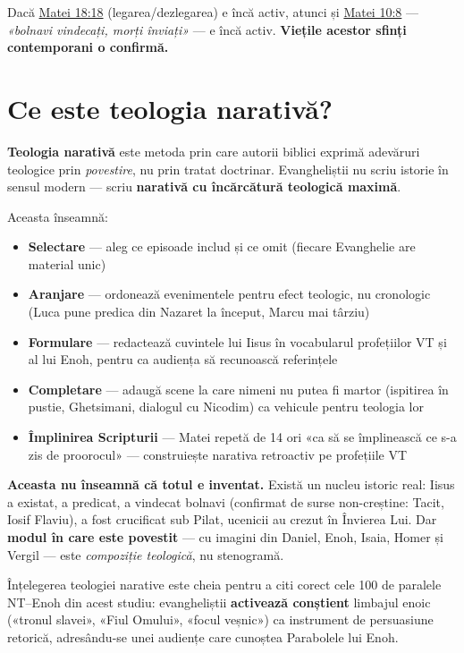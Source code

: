 \documentclass[12pt,a4paper,twoside,openany]{book}
\begin{document}
Dacă \href{https://bibliaortodoxa.ro/carte.php?id=55\&cap=18\#18}{Matei 18:18} (legarea/dezlegarea) e încă activ, atunci și \href{https://bibliaortodoxa.ro/carte.php?id=55\&cap=10\#8}{Matei 10:8} — \textit{«bolnavi vindecați, morți înviați»} — e încă activ. \textbf{Viețile acestor sfinți contemporani o confirmă.}


\chapter{Ce este teologia narativă?}\label{ce-este}
\textbf{Teologia narativă} este metoda prin care autorii biblici exprimă adevăruri teologice prin \textit{povestire}, nu prin tratat doctrinar. Evangheliștii nu scriu istorie în sensul modern — scriu \textbf{narativă cu încărcătură teologică maximă}.

Aceasta înseamnă:

\begin{itemize}
  \item \textbf{Selectare} — aleg ce episoade includ și ce omit (fiecare Evanghelie are material unic)
  \item \textbf{Aranjare} — ordonează evenimentele pentru efect teologic, nu cronologic (Luca pune predica din Nazaret la început, Marcu mai târziu)
  \item \textbf{Formulare} — redactează cuvintele lui Iisus în vocabularul profețiilor VT și al lui Enoh, pentru ca audiența să recunoască referințele
  \item \textbf{Completare} — adaugă scene la care nimeni nu putea fi martor (ispitirea în pustie, Ghetsimani, dialogul cu Nicodim) ca vehicule pentru teologia lor
  \item \textbf{Împlinirea Scripturii} — Matei repetă de 14 ori «ca să se împlinească ce s-a zis de proorocul» — construiește narativa retroactiv pe profețiile VT
\end{itemize}
\textbf{Aceasta nu înseamnă că totul e inventat.} Există un nucleu istoric real: Iisus a existat, a predicat, a vindecat bolnavi (confirmat de surse non-creștine: Tacit, Iosif Flaviu), a fost crucificat sub Pilat, ucenicii au crezut în Învierea Lui. Dar \textbf{modul în care este povestit} — cu imagini din Daniel, Enoh, Isaia, Homer și Vergil — este \textit{compoziție teologică}, nu stenogramă.

Înțelegerea teologiei narative este cheia pentru a citi corect cele 100 de paralele NT–Enoh din acest studiu: evangheliștii \textbf{activează conștient} limbajul enoic («tronul slavei», «Fiul Omului», «focul veșnic») ca instrument de persuasiune retorică, adresându-se unei audiențe care cunoștea Parabolele lui Enoh.
\end{document}
